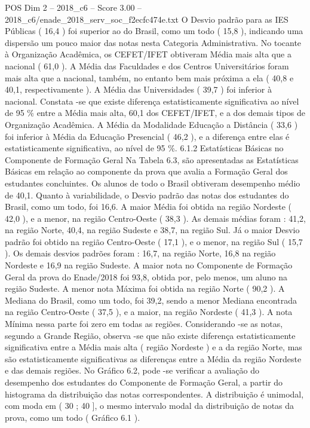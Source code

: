 \begin{textsample}{POS Dim 2 – 2018\_c6 – Score 3.00 – 2018\_c6/enade\_2018\_serv\_soc\_f2ecfc474e.txt}
O Desvio padrão para as IES Públicas ( 16,4 ) foi superior ao do Brasil, como um todo ( 15,8 ), indicando uma dispersão um pouco maior das notas nesta Categoria Administrativa.
No tocante à Organização Acadêmica, os CEFET/IFET obtiveram Média mais alta que a nacional ( 61,0 ).
A Média das Faculdades e dos Centros Universitários foram mais alta que a nacional, também, no entanto bem mais próxima a ela ( 40,8 e 40,1, respectivamente ).
A Média das Universidades ( 39,7 ) foi inferior à nacional.
Constata -se que existe diferença estatisticamente significativa ao nível de 95 \% entre a Média mais alta, 60,1 dos CEFET/IFET, e a dos demais tipos de Organização Acadêmica.
A Média da Modalidade Educação a Distância ( 33,6 ) foi inferior à Média da Educação Presencial ( 46,2 ), e a diferença entre elas é estatisticamente significativa, ao nível de 95 \%. 6.1.2 Estatísticas Básicas no Componente de Formação Geral Na Tabela 6.3, são apresentadas as Estatísticas Básicas em relação ao componente da prova que avalia a Formação Geral dos estudantes concluintes.
Os alunos de todo o Brasil obtiveram desempenho médio de 40,1.
Quanto à variabilidade, o Desvio padrão das notas dos estudantes do Brasil, como um todo, foi 16,6.
A maior Média foi obtida na região Nordeste ( 42,0 ), e a menor, na região Centro-Oeste ( 38,3 ).
As demais médias foram : 41,2, na região Norte, 40,4, na região Sudeste e 38,7, na região Sul.
Já o maior Desvio padrão foi obtido na região Centro-Oeste ( 17,1 ), e o menor, na região Sul ( 15,7 ).
Os demais desvios padrões foram : 16,7, na região Norte, 16,8 na região Nordeste e 16,9 na região Sudeste.
A maior nota no Componente de Formação Geral da prova do Enade/2018 foi 93,8, obtida por, pelo menos, um aluno na região Sudeste.
A menor nota Máxima foi obtida na região Norte ( 90,2 ).
A Mediana do Brasil, como um todo, foi 39,2, sendo a menor Mediana encontrada na região Centro-Oeste ( 37,5 ), e a maior, na região Nordeste ( 41,3 ).
A nota Mínima nessa parte foi zero em todas as regiões.
Considerando -se as notas, segundo a Grande Região, observa -se que não existe diferença estatisticamente significativa entre a Média mais alta ( região Nordeste ) e a da região Norte, mas são estatisticamente significativas as diferenças entre a Média da região Nordeste e das demais regiões.
No Gráfico 6.2, pode -se verificar a avaliação do desempenho dos estudantes do Componente de Formação Geral, a partir do histograma da distribuição das notas correspondentes.
A distribuição é unimodal, com moda em ( 30 ; 40 ], o mesmo intervalo modal da distribuição de notas da prova, como um todo ( Gráfico 6.1 ).

\end{textsample}
